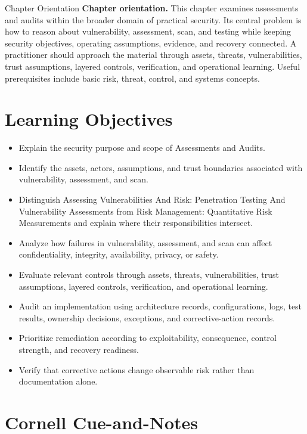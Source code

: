 \documentclass[11pt,letterpaper]{article}
\title{\CornellDocumentTitle}
\author{}
\date{}
\begin{document}
\maketitle
\begin{CornellOverviewBox}{Chapter Orientation}
\textbf{Chapter orientation.} This chapter examines assessments and audits within the broader domain of practical security. Its central problem is how to reason about vulnerability, assessment, scan, and testing while keeping security objectives, operating assumptions, evidence, and recovery connected. A practitioner should approach the material through assets, threats, vulnerabilities, trust assumptions, layered controls, verification, and operational learning. Useful prerequisites include basic risk, threat, control, and systems concepts.
\end{CornellOverviewBox}
\section*{Learning Objectives}
\begin{itemize}
\item Explain the security purpose and scope of Assessments and Audits.
\item Identify the assets, actors, assumptions, and trust boundaries associated with vulnerability, assessment, and scan.
\item Distinguish Assessing Vulnerabilities And Risk: Penetration Testing And Vulnerability Assessments from Risk Management: Quantitative Risk Measurements and explain where their responsibilities intersect.
\item Analyze how failures in vulnerability, assessment, and scan can affect confidentiality, integrity, availability, privacy, or safety.
\item Evaluate relevant controls through assets, threats, vulnerabilities, trust assumptions, layered controls, verification, and operational learning.
\item Audit an implementation using architecture records, configurations, logs, test results, ownership decisions, exceptions, and corrective-action records.
\item Prioritize remediation according to exploitability, consequence, control strength, and recovery readiness.
\item Verify that corrective actions change observable risk rather than documentation alone.
\end{itemize}
\section*{Cornell Cue-and-Notes}
\end{document}
